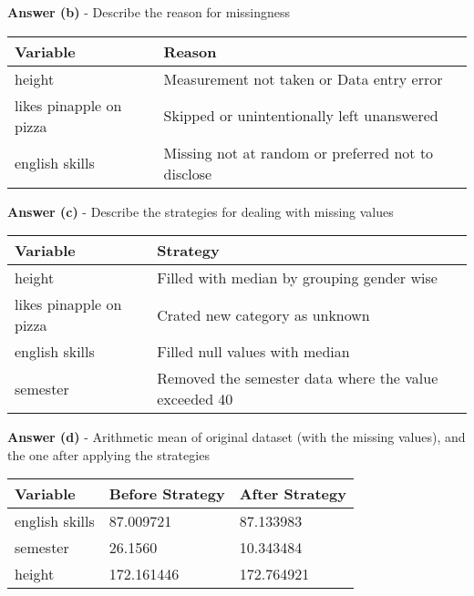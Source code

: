 \documentclass[a4paper,10pt]{article}\setlength{\textheight}{10in}\setlength{\textwidth}{6.5in}\setlength{\topmargin}{-0.125in}\setlength{\oddsidemargin}{-.2in}\setlength{\evensidemargin}{-.2in}\setlength{\headsep}{0.2in}\setlength{\footskip}{0pt}\usepackage{amsmath}\usepackage{fancyhdr}\usepackage{enumitem}\usepackage{hyperref}\usepackage{xcolor}\usepackage{graphicx}\usepackage[export]{adjustbox}\usepackage{caption}\usepackage{float}\usepackage{booktabs}\usepackage{makecell}\pagestyle{fancy}
\begin{document}
\begin{enumerate}[topsep=0mm, partopsep=0mm, leftmargin=*]
\textbf{Answer (b)} - Describe the reason for missingness
\begin{center}
\begin{tabular}{ll}
\toprule
\textbf{Variable} & \textbf{Reason} \\ \midrule
height & Measurement not taken or Data entry error \\
likes pinapple on pizza  & Skipped or unintentionally left unanswered \\
english skills & Missing not at random or preferred not to disclose  \\
\bottomrule
\end{tabular}
\end{center}

\textbf{Answer (c)} - Describe the strategies for dealing with missing values
\begin{center}
\begin{tabular}{ll}
\toprule
\textbf{Variable} & \textbf{Strategy} \\ \midrule
height & Filled with median by grouping gender wise \\
likes pinapple on pizza  & Crated new category as unknown \\
english skills & Filled null values with median \\
semester & Removed the semester data where the value exceeded 40 \\
\bottomrule
\end{tabular}
\end{center}

\textbf{Answer (d)} - Arithmetic mean of original dataset (with the missing values), and the one after applying the strategies
\begin{center}
\begin{tabular}{lll}
\toprule
\textbf{Variable} & \textbf{Before Strategy} & \textbf{After Strategy} \\ \midrule
english skills & 87.009721 & 87.133983 \\
semester & 26.1560 & 10.343484 \\
height & 172.161446 & 172.764921 \\

\bottomrule
\end{tabular}
\end{center}

\end{enumerate}
\end{document}
